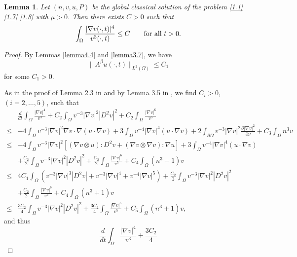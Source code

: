 \documentclass[12pt]{article}
\theoremstyle{plain}
\newtheorem{lemma}{Lemma}[section]
\theoremstyle{definition}
\numberwithin{equation}{section}
\begin{document}
\begin{lemma}\label{lemma4.6}
	Let $(n,v,u,P)$ be the global classical solution of the problem \eqref{1.1} \eqref{1.7} \eqref{1.8} with $\mu>0$.
Then there exists $C>0$ such that
\begin{equation}\label{4.14}
\int_\Omega \frac{|\nabla v(\cdot,t)|^4}{v^3(\cdot,t)}\le C \quad\quad \hbox{for all}\,\, t>0.
\end{equation}
\end{lemma}
\begin{proof}
By Lemmas \ref{lemma4.4} and \ref{lemma3.7}, we have
 \begin{equation}\label{4.15}
\|A^\beta u(\cdot,t)\|_{L^2(\Omega)} \leq C_1
\end{equation}
for some $C_1>0$.

As in the proof of Lemma 2.3  in \cite{WinklerJDE2024} and by Lemma 3.5 in \cite{WinklerDCDSB(2022)},
we find $C_i>0$, $(i=2,\ldots,5)$, such that
\begin{equation*}%
\begin{split}
&\frac d{dt} \int_\Omega  \frac{|\nabla v|^4}{v^3}+C_2\int_\Omega v^{-3}|\nabla v|^2 |D^2 v|^2 + C_2
\int_\Omega \frac{|\nabla v|^6}{ v^5}
\\
\leq & -4
\int_\Omega v^{-3}|\nabla v|^2 \nabla v\cdot \nabla ( u\cdot \nabla v )
+3
\int_\Omega v^{-4}|\nabla v|^4  (u\cdot \nabla v )+
  2\int_{\partial\Omega}v^{-3}|\nabla v|^2
\frac {\partial |\nabla v|^2}{\partial \nu}+C_3\int_\Omega n^3 v \\
\leq &
-4\int_\Omega v^{-3}|\nabla v|^2[ ( \nabla v \otimes u):D^2 v+(\nabla v\otimes \nabla v):\nabla u]
+3\int_\Omega v^{-4}|\nabla v|^4  (u\cdot \nabla v )\\
& +\frac {C_2}2\int_\Omega v^{-3}|\nabla v|^2 |D^2 v|^2
+\frac {C_2}2
\int_\Omega \frac{|\nabla v|^6}{ v^5}+C_4\int_\Omega (n^3+1)v \\
\leq &
4C_1\int_\Omega
\left(
v^{-3}|\nabla v|^3|D^2 v|+
v^{-3}|\nabla v|^4+ v^{-4}|\nabla v|^5\right) +\frac {C_2}2\int_\Omega v^{-3}|\nabla v|^2 |D^2 v|^2
\\
&+\frac {C_2}2
\int_\Omega \frac{|\nabla v|^6}{ v^5}+C_4\int_\Omega (n^3+1)v \\
\leq &
\frac {3C_2}4\int_\Omega v^{-3}|\nabla v|^2 |D^2 v|^2
+\frac {3C_2}4
\int_\Omega \frac{|\nabla v|^6}{ v^5}+C_5\int_\Omega (n^3+1)v,
\end{split}
\end{equation*}
and thus
\begin{equation}\label{4.16}
\frac d{dt} \int_\Omega  \frac{|\nabla v|^4}{v^3}+\frac {3C_2}4

\end{equation}
\end{proof}
\end{document}
